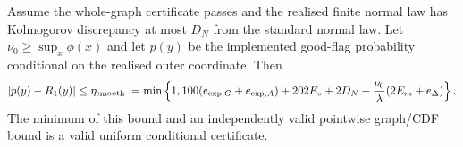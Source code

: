\begin{theorem}
\label{thm:raw-asymmetric-conditional}
Assume the whole-graph certificate passes and the realised finite normal
law has Kolmogorov discrepancy at most $D_N$ from the standard normal
law. Let $\nu_0\geq\sup_x\phi(x)$ and let $p(y)$ be the implemented
good-flag probability conditional on the realised outer coordinate. Then
\begin{equation}
 |p(y)-R_1(y)|\leq\eta_{\rm smooth}:=
 \min\left\{1,100(e_{\exp,G}+e_{\exp,A})+202E_s+2D_N+
       \frac{\nu_0}{\lambda}(2E_m+e_\Delta)\right\}.
\end{equation}
The minimum of this bound and an independently valid pointwise
graph/CDF bound is a valid uniform conditional certificate.
\end{theorem}
